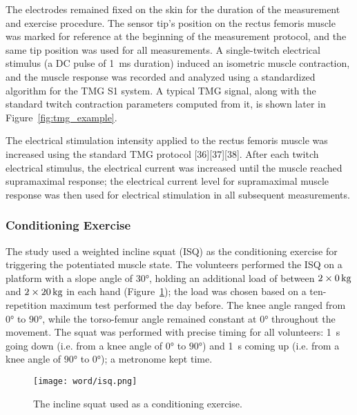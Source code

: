 \documentclass[utf8]{style/FrontiersinHarvard}
\begin{document}
The electrodes remained fixed on the skin for the duration of the measurement and exercise procedure.
The sensor tip's position on the rectus femoris muscle was marked for reference at the beginning of the measurement protocol, and the same tip position was used for all measurements.
A single-twitch electrical stimulus (a DC pulse of \SI{1}{\milli \second} duration) induced an isometric muscle contraction,
and the muscle response was recorded and analyzed using a standardized algorithm for the TMG S1 system.
A typical TMG signal, along with the standard twitch contraction parameters computed from it, is shown later in Figure~\ref{fig:tmg_example}.

The electrical stimulation intensity applied to the rectus femoris muscle was increased using the standard TMG protocol [36][37][38].
After each twitch electrical stimulus, the electrical current was increased until the muscle reached supramaximal response;
the electrical current level for supramaximal muscle response was then used for electrical stimulation in all subsequent measurements.

\subsubsection{Conditioning Exercise}
The study used a weighted incline squat (ISQ) as the conditioning exercise for triggering the potentiated muscle state. 
The volunteers performed the ISQ on a platform with a slope angle of $ \ang{30} $, holding an additional load of between $ \SI[parse-numbers = false, mode = match]{2 \times 0}{\kilogram} $ and $ \SI[parse-numbers = false, mode = match]{2 \times 20}{\kilogram} $ in each hand (Figure~\ref{fig:isq});
the load was chosen based on a ten-repetition maximum test performed the day before.
The knee angle ranged from $ \ang{0} $ to $ \ang{90} $, while the torso-femur angle remained constant at $ \ang{0} $ throughout the movement.
The squat was performed with precise timing for all volunteers: \SI{1}{\second} going down (i.e. from a knee angle of $ \ang{0} $ to $ \ang{90} $) and \SI{1}{\second} coming up (i.e. from a knee angle of $ \ang{90} $ to $ \ang{0} $); a metronome kept time.

\begin{figure}[htb!]
	\centering
    \texttt{[image: word/isq.png]}
    \caption{The incline squat used as a conditioning exercise.}
    \label{fig:isq}
\end{figure}
\end{document}
